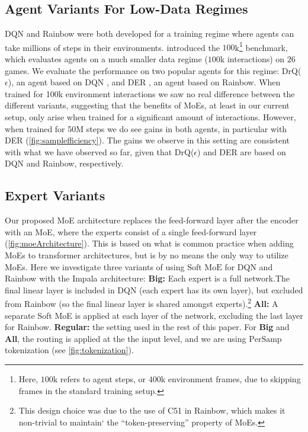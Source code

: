 \documentclass{article}
\theoremstyle{plain}
\theoremstyle{definition}
\theoremstyle{remark}
\newcommand{\johan}[1]{\textcolor{green}{\textbf{[johan: }#1\textbf{]}}}
\newcommand{\softmoe}{$\textrm{Soft MoE}$}
\newcommand{\token}[1]{$\textrm{#1}$}
\begin{document}
\subsection{Agent Variants For Low-Data Regimes}\label{sec:sample_eff}
DQN and Rainbow were both developed for a training regime where agents can take millions of steps in their environments. \citet{kaiser2020model} introduced the $100$k\footnote{Here, $100$k refers to agent steps, or $400$k environment frames, due to skipping frames in the standard training setup.} benchmark, which evaluates agents on a much smaller data regime ($100$k interactions) on $26$ games.
We evaluate the performance on two popular agents for this regime: DrQ($\epsilon$), an agent based on DQN \citep{yarats2021image,agarwal2021deep}, and DER \citep{van2019use}, an agent based on Rainbow. When trained for 100k environment interactions we saw no real difference between the different variants, suggesting that the benefits of MoEs, at least in our current setup, only arise when trained for a significant amount of interactions. %
However, when trained for 50M steps we do see gains in both agents, in particular with DER (\cref{fig:samplefficiency}). The gains we observe in this setting are consistent with what we have observed so far, given that DrQ($\epsilon$) and DER are based on DQN and Rainbow, respectively.

\vspace{0.2cm}
\subsection{Expert Variants}
\label{sec:arch_exploration}


Our proposed MoE architecture replaces the feed-forward layer after the encoder with an MoE, where the experts consist of a single feed-forward layer (\cref{fig:moeArchitecture}). This is based on what is common practice when adding MoEs to transformer architectures, but is by no means the only way to utilize MoEs.
Here we investigate three variants of using \softmoe{} for DQN and Rainbow with the Impala architecture:
{\bf Big:} Each expert is a full network.The final linear layer is included in DQN (each expert has its own layer), but excluded from Rainbow (so the final linear layer is shared amongst experts).\footnote{This design choice was due to the use of C51 in Rainbow, which makes it non-trivial to maintain`    the ``token-preserving'' property of MoEs.}
{\bf All:} A separate Soft MoE is applied at each layer of the network, excluding the last layer for Rainbow.
{\bf Regular:} the setting used in the rest of this paper.
For {\bf Big} and {\bf All}, the routing is applied at the the input level, and we are using \token{PerSamp} tokenization (see \cref{fig:tokenization}).
\end{document}
